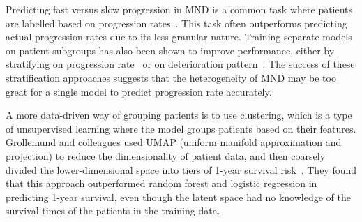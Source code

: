 


Predicting fast versus slow progression in MND is a common task where patients are labelled based on progression rates~\cite{ongPredictingFunctionalDecline2017, dinabduljabbarPredictingAmyotrophicLateral2023}.
This task often outperforms predicting actual progression rates due to its less granular nature.
Training separate models on patient subgroups has also been shown to improve performance, either by stratifying on progression rate~\cite{piresPredictingNoninvasiveVentilation2018} or on deterioration pattern~\cite{halbersbergTemporalModelingDeterioration2019}.
The success of these stratification approaches suggests that the heterogeneity of MND may be too great for a single model to predict progression rate accurately.

A more data-driven way of grouping patients is to use clustering, which is a type of unsupervised learning where the model groups patients based on their features.
Grollemund and colleagues used UMAP (uniform manifold approximation and projection) to reduce the dimensionality of patient data, and then coarsely divided the lower-dimensional space into tiers of 1-year survival risk~\cite{grollemundDevelopmentValidation1year2020}.
They found that this approach outperformed random forest and logistic regression in predicting 1-year survival, even though the latent space had no knowledge of the survival times of the patients in the training data.

